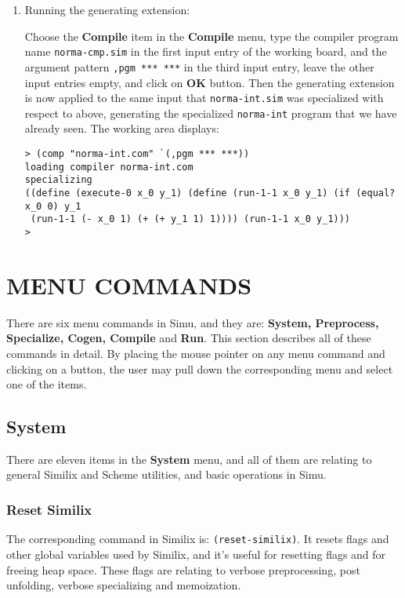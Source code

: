 \begin{sloppypar}
\begin{enumerate}
\item Running the generating extension:

     Choose the {\bf Compile} item in the {\bf Compile} menu, type the
compiler program name {\tt norma-cmp.sim} in the first input entry of
the working board, and the argument pattern {\tt ,pgm *** ***} in the
third input entry, leave the other input entries empty, and click on
{\bf OK} button.  Then the generating extension is now applied to the
same input that {\tt norma-int.sim} was specialized with respect to
above, generating the specialized {\tt norma-int} program that we have
already seen. The working area displays:

\begin{verbatim}
> (comp "norma-int.com" `(,pgm *** ***))
loading compiler norma-int.com
specializing
((define (execute-0 x_0 y_1) (define (run-1-1 x_0 y_1) (if (equal? x_0 0) y_1
 (run-1-1 (- x_0 1) (+ (+ y_1 1) 1)))) (run-1-1 x_0 y_1)))
>
\end{verbatim}
\end{enumerate}


\section{MENU COMMANDS}


There are six menu commands in Simu, and they are: {\bf System,
Preprocess, Specialize, Cogen, Compile} and {\bf Run}. This section
describes all of these commands in detail. By placing the mouse
pointer on any menu command and clicking on a button, the user may
pull down the corresponding menu and select one of the items.



\subsection{System}


There are eleven items in the {\bf System} menu, and all of them are
relating to general Similix and Scheme utilities, and basic operations
in Simu.



\subsubsection{Reset Similix}


The corresponding command in Similix is: {\tt (reset-similix)}. It
resets flags and other global variables used by Similix, and it's
useful for resetting flags and for freeing heap space. These flags are
relating to verbose preprocessing, post unfolding, verbose
specializing and memoization. 


\end{sloppypar}
